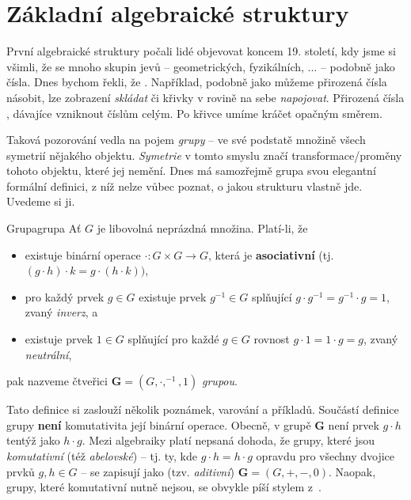 \section{Základní algebraické struktury}
\label{sec:zakladni-algebraicke-struktury}

První algebraické struktury počali lidé objevovat koncem 19. století, kdy jsme
si všimli, že se mnoho skupin jevů -- geometrických, fyzikálních, ... --
 podobně jako čísla. Dnes bychom řekli, že . Například, podobně jako můžeme přirozená čísla násobit, lze zobrazení
\emph{skládat} či křivky v rovině na sebe \emph{napojovat}. Přirozená čísla
, dávajíce vzniknout číslům celým. Po křivce umíme kráčet opačným
směrem.

Taková pozorování vedla na pojem \emph{grupy} -- ve své podstatě množině všech
symetrií nějakého objektu. \emph{Symetrie} v tomto smyslu značí
transformace/proměny tohoto objektu, které jej nemění. Dnes má samozřejmě grupa
svou elegantní formální definici, z níž nelze vůbec poznat, o jakou strukturu
vlastně jde. Uvedeme si ji.

\begin{definition}{Grupa}{grupa}
 Ať $G$ je libovolná neprázdná množina. Platí-li, že
 \begin{itemize}
  \item existuje binární operace $ \cdot :G \times G \to G$, která je
  \textbf{asociativní} (tj. $(g \cdot h) \cdot k = g \cdot (h \cdot k))$,
 \item pro každý prvek $g \in G$ existuje prvek $g^{-1} \in G$ splňující
  $g \cdot g^{-1} = g^{-1} \cdot g = 1$, zvaný \emph{inverz}, a
 \item existuje prvek $1 \in G$ splňující pro každé $g \in G$ rovnost $g \cdot 1
  = 1 \cdot g = g$, zvaný \emph{neutrální},
 \end{itemize}
 pak nazveme čtveřici $\mathbf{G} = (G, \cdot ,^{-1},1)$ \emph{grupou}.
\end{definition}
Tato definice si zaslouží několik poznámek, varování a příkladů. Součástí
definice grupy \textbf{není} komutativita její binární operace. Obecně, v grupě
$\mathbf{G}$ není prvek $g \cdot h$ tentýž jako $h \cdot g$. Mezi algebraiky
platí nepsaná dohoda, že grupy, které jsou \emph{komutativní} (též
\emph{abelovské}) -- tj. ty, kde $g \cdot h = h \cdot g$ opravdu pro všechny
dvojice prvků $g,h \in G$ -- se zapisují jako (tzv. \emph{aditivní}) $\mathbf{G}
= (G,+,-,0)$. Naopak, grupy, které komutativní nutně nejsou, se obvykle píší
stylem z~.

